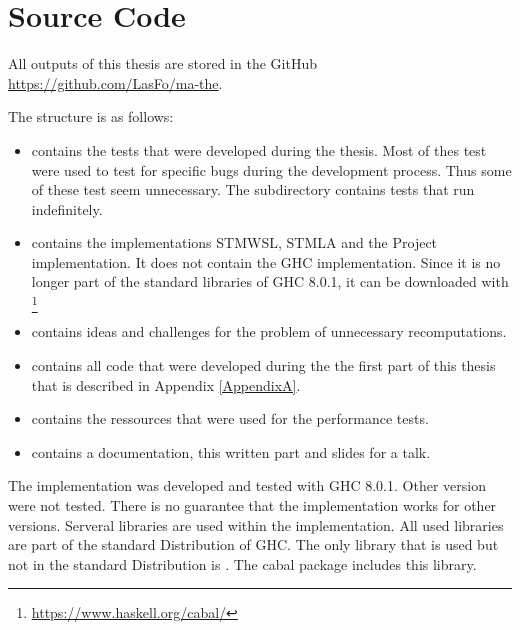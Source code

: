 
\chapter{Source Code} 
\label{AppendixC} 

All outputs of this thesis are stored in the GitHub \url{https://github.com/LasFo/ma-the}.

The structure is as follows:
\begin{itemize}
 \item {} contains the tests that were developed during the thesis. Most of thes test were
                    used to test for specific bugs during the development process. Thus some of these
                    test seem unnecessary. The subdirectory contains
                    tests that run indefinitely. 
 \item {} contains the implementations STMWSL, STMLA and the Project implementation.
                             It does not contain the GHC implementation. Since it is no longer part of 
                             the standard libraries of GHC 8.0.1, it can be downloaded with \footnote{\url{https://www.haskell.org/cabal/}}
 \item {} contains ideas and challenges for the problem of unnecessary recomputations.
 \item {} contains all code that were developed during the the first part of this thesis that is described in Appendix \ref{AppendixA}.
 \item {} contains the ressources that were used for the performance tests.
 \item {} contains a documentation, this written part and slides for a talk.
\end{itemize}

The implementation was developed and tested with GHC 8.0.1. Other version were not tested. There 
is no guarantee that the implementation works for other versions. Serveral libraries are used 
within the implementation. All used libraries are part of the standard Distribution of GHC. 
The only library that is used but not in the standard Distribution is . 
The cabal package  includes this library. 